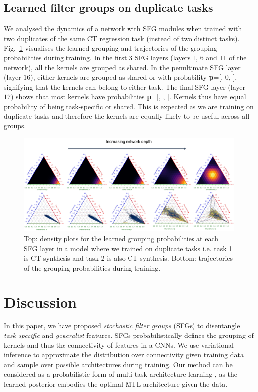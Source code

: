 \subsection{Learned filter groups on duplicate tasks}
We analysed the dynamics of a network with SFG modules when trained with two duplicates of the same CT regression task (instead of two distinct tasks). Fig.~\ref{fig:duplicate} visualises the learned grouping and trajectories of the grouping probabilities during training. In the first $3$ SFG layers (layers $1$, $6$ and $11$ of the network), all the kernels are grouped as shared. In the penultimate SFG layer (layer $16$), either kernels are grouped as shared or with probability \textbf{p}=[, 0, ], signifying that the kernels can belong to either task. The final SFG layer (layer $17$) shows that most kernels have probabilities \textbf{p}=[, , ]. Kernels thus have equal probability of being task-specific or shared. This is expected as we are training on duplicate tasks and therefore the kernels are equally likely to be useful across all groups.

\begin{figure}[ht]
	\centering
	\includegraphics[width=1.0\textwidth]{chapter_6/figures_supp/final_dup.pdf}
	\caption{Top: density plots for the learned grouping probabilities at each SFG layer in a model where we trained on duplicate tasks i.e. task 1 is CT synthesis and task 2 is also CT synthesis. Bottom: trajectories of the grouping probabilities during training.}
	\label{fig:duplicate}
\end{figure}






\section{Discussion}
In this paper, we have proposed \emph{stochastic filter groups} (SFGs) to disentangle \emph{task-specific} and \emph{generalist} features. SFGs probabilistically defines the grouping of kernels and thus the connectivity of features in a CNNs. We use variational inference to approximate the distribution over connectivity given training data and sample over possible architectures during training. Our method can be considered as a probabilistic form of multi-task architecture learning \cite{liang2018evolutionary}, as the learned posterior embodies the optimal MTL architecture given the data.

